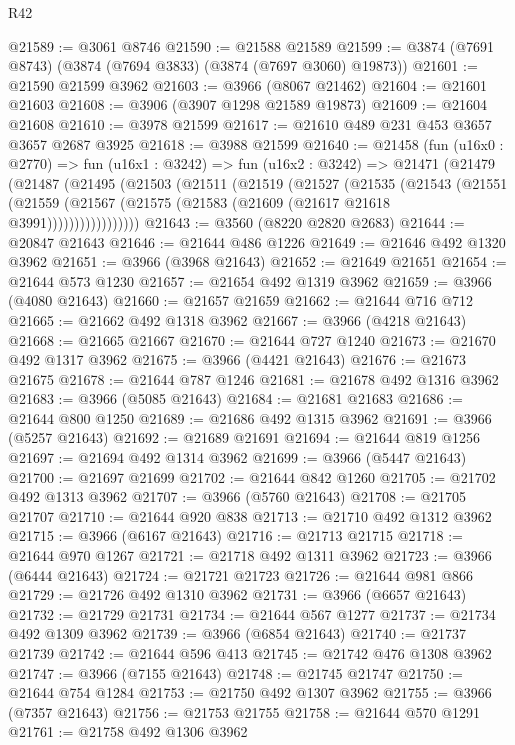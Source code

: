 \begin{lexlean}{R42}
\begin{coremodule}
@21589 := @3061 @8746
@21590 := @21588 @21589
@21599 := @3874 (@7691 @8743) (@3874 (@7694 @3833) (@3874 (@7697 @3060) @19873))
@21601 := @21590 @21599 @3962
@21603 := @3966 (@8067 @21462)
@21604 := @21601 @21603
@21608 := @3906 (@3907 @1298 @21589 @19873)
@21609 := @21604 @21608
@21610 := @3978 @21599
@21617 := @21610 @489 @231 @453 @3657 @3657 @2687 @3925
@21618 := @3988 @21599
@21640 := @21458
    (fun (u16x0 : @2770) =>
    fun (u16x1 : @3242) =>
    fun (u16x2 : @3242) =>
    @21471
      (@21479
        (@21487
          (@21495
            (@21503
              (@21511
                (@21519
                  (@21527
                    (@21535
                      (@21543
                        (@21551
                          (@21559
                            (@21567 (@21575 (@21583 (@21609 (@21617 @21618 @3991)))))))))))))))))
@21643 := @3560 (@8220 @2820 @2683)
@21644 := @20847 @21643
@21646 := @21644 @486 @1226
@21649 := @21646 @492 @1320 @3962
@21651 := @3966 (@3968 @21643)
@21652 := @21649 @21651
@21654 := @21644 @573 @1230
@21657 := @21654 @492 @1319 @3962
@21659 := @3966 (@4080 @21643)
@21660 := @21657 @21659
@21662 := @21644 @716 @712
@21665 := @21662 @492 @1318 @3962
@21667 := @3966 (@4218 @21643)
@21668 := @21665 @21667
@21670 := @21644 @727 @1240
@21673 := @21670 @492 @1317 @3962
@21675 := @3966 (@4421 @21643)
@21676 := @21673 @21675
@21678 := @21644 @787 @1246
@21681 := @21678 @492 @1316 @3962
@21683 := @3966 (@5085 @21643)
@21684 := @21681 @21683
@21686 := @21644 @800 @1250
@21689 := @21686 @492 @1315 @3962
@21691 := @3966 (@5257 @21643)
@21692 := @21689 @21691
@21694 := @21644 @819 @1256
@21697 := @21694 @492 @1314 @3962
@21699 := @3966 (@5447 @21643)
@21700 := @21697 @21699
@21702 := @21644 @842 @1260
@21705 := @21702 @492 @1313 @3962
@21707 := @3966 (@5760 @21643)
@21708 := @21705 @21707
@21710 := @21644 @920 @838
@21713 := @21710 @492 @1312 @3962
@21715 := @3966 (@6167 @21643)
@21716 := @21713 @21715
@21718 := @21644 @970 @1267
@21721 := @21718 @492 @1311 @3962
@21723 := @3966 (@6444 @21643)
@21724 := @21721 @21723
@21726 := @21644 @981 @866
@21729 := @21726 @492 @1310 @3962
@21731 := @3966 (@6657 @21643)
@21732 := @21729 @21731
@21734 := @21644 @567 @1277
@21737 := @21734 @492 @1309 @3962
@21739 := @3966 (@6854 @21643)
@21740 := @21737 @21739
@21742 := @21644 @596 @413
@21745 := @21742 @476 @1308 @3962
@21747 := @3966 (@7155 @21643)
@21748 := @21745 @21747
@21750 := @21644 @754 @1284
@21753 := @21750 @492 @1307 @3962
@21755 := @3966 (@7357 @21643)
@21756 := @21753 @21755
@21758 := @21644 @570 @1291
@21761 := @21758 @492 @1306 @3962

\end{coremodule}
\end{lexlean}

